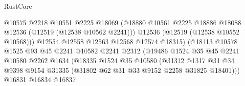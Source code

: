 \begin{lexlean}{RustCore}
\begin{coremodule}
                                          @10575
                                          @2218
                                          @10551
                                          @2225
                                          @18069
                                          (@18880
                                            @10561
                                            @2225
                                            @18886
                                            @18088
                                            @12536
                                            (@12519 (@12538 @10562 @2241)))
                                          @12536
                                          (@12519 (@12538 @10552 @10568)))
                                        @12554
                                        @12558
                                        @12563
                                        @12568
                                        @12574
                                        @18315)
                                      (@18113
                                        @10578
                                        @1525
                                        @93
                                        @45
                                        @2241
                                        @10582
                                        @2241
                                        @2312
                                        (@19486
                                          @1524
                                          @35
                                          @45
                                          @2241
                                          @10580
                                          @2262
                                          @1634
                                          (@18335
                                            @1524
                                            @35
                                            @10580
                                            (@31312
                                              @1317
                                              @31
                                              @34
                                              @9398
                                              @9154
                                              @31335
                                              (@31802 @62 @31 @33 @9152 @2258 @31825 @18401)))
                                          @16831
                                          @16834
                                          @16837

\end{coremodule}
\end{lexlean}

